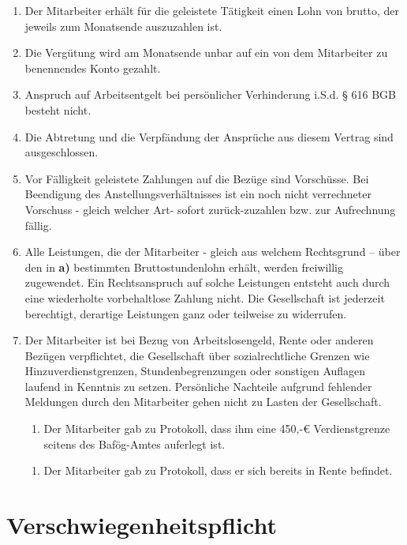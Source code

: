\documentclass[twoside,a4paper]{scrreprt}
\begin{document}
    \centerline{ }
    \begin{enumerate}[label=(\alph*)]
    	\ifdefined\pauschal\item Der Mitarbeiter erhält für die geleistete Tätigkeit einen Lohn von \lohn \white brutto, der jeweils zum Monatsende auszuzahlen ist.
    	\fi
    	\item Die Vergütung wird am Monatsende unbar auf ein von dem Mitarbeiter zu benennendes Konto gezahlt.
    	\item Anspruch auf Arbeitsentgelt bei persönlicher Verhinderung i.S.d. § 616 BGB besteht nicht.
    	\item Die Abtretung und die Verpfändung der Ansprüche aus diesem Vertrag sind ausgeschlossen.
    	\item Vor Fälligkeit geleistete Zahlungen auf die Bezüge sind Vorschüsse. Bei Beendigung des Anstellungsverhältnisses ist ein noch nicht verrechneter Vorschuss - gleich welcher Art- sofort zurück-zuzahlen bzw. zur Aufrechnung fällig.
    	\item Alle Leistungen, die der Mitarbeiter - gleich aus welchem Rechtsgrund – über den in \textbf{a)} bestimmten Bruttostundenlohn erhält, werden freiwillig zugewendet. Ein Rechtsanspruch auf solche Leistungen entsteht auch durch eine wiederholte vorbehaltlose Zahlung nicht. Die Gesellschaft ist jederzeit berechtigt, derartige Leistungen ganz oder teilweise zu widerrufen.
    	\item Der Mitarbeiter ist bei Bezug von Arbeitslosengeld, Rente oder anderen Bezügen verpflichtet, die Gesellschaft über sozialrechtliche Grenzen wie Hinzuverdienstgrenzen, Stundenbegrenzungen oder sonstigen Auflagen laufend in Kenntnis zu setzen. Persönliche Nachteile aufgrund fehlender Meldungen durch den Mitarbeiter gehen nicht zu Lasten der Gesellschaft.
    	\ifdefined\bafoeg\begin{enumerate}
    	    \item Der Mitarbeiter gab zu Protokoll, dass ihm eine 450,-€ Verdienstgrenze seitens des Bafög-Amtes auferlegt ist.
    	\end{enumerate}
    	\fi
    	\ifdefined\rente\begin{enumerate}
    	    \item Der Mitarbeiter gab zu Protokoll, dass er sich bereits in Rente befindet.
    	\end{enumerate}
    	\fi
    \end{enumerate}
\newpage
      
\newpage
\section{Verschwiegenheitspflicht}
\end{document}
